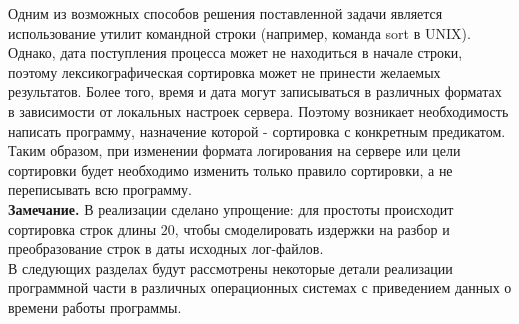 Одним из возможных способов решения поставленной задачи является использование утилит командной строки (например, команда sort в UNIX). Однако, дата поступления процесса может не находиться в начале строки, поэтому лексикографическая сортировка может не принести желаемых результатов. Более того, время и дата могут записываться в различных форматах в зависимости от локальных настроек сервера. Поэтому возникает необходимость написать программу, назначение которой - сортировка с конкретным предикатом. Таким образом, при изменении формата логирования на сервере или цели сортировки будет необходимо изменить только правило сортировки, а не переписывать всю программу.\\
\textbf{Замечание.} В реализации сделано упрощение: для простоты происходит сортировка строк длины $20$, чтобы смоделировать издержки на разбор и преобразование строк в даты исходных лог-файлов.
\\
В следующих разделах будут рассмотрены некоторые детали реализации программной части в различных операционных системах с приведением данных о времени работы программы.